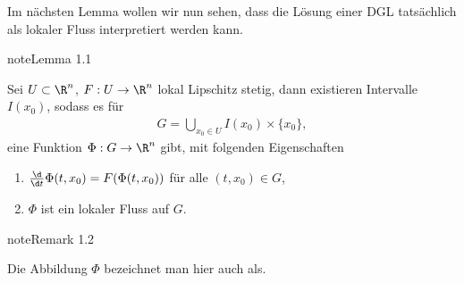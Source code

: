 \documentclass[letterpaper,10pt,english]{jupyterBook}
\begin{document}
Im nächsten Lemma wollen wir nun sehen, dass die Lösung einer DGL tatsächlich als lokaler Fluss interpretiert werden kann.
\label{ode/fluesse:lemma-3}
\begin{sphinxadmonition}{note}{Lemma 1.1}



Sei \(U\subset\R^n\), \(F:U \rightarrow \R^n\) lokal Lipschitz stetig, dann existieren Intervalle \(I(x_0)\), sodass es für
\begin{equation*}
\begin{split}G = \bigcup_{x_0\in U} I(x_0)\times\{x_0\},\end{split}
\end{equation*}
eine Funktion \(\Phi:G\rightarrow \R^n\) gibt, mit folgenden Eigenschaften
\begin{enumerate}
%
\item {} 
\(\frac{\d}{\d t} \Phi(t, x_0) = F(\Phi(t, x_0))\) für alle \((t,x_0)\in G\),

\item {} 
\(\Phi\) ist ein lokaler Fluss auf \(G\).

\end{enumerate}
\end{sphinxadmonition}
\label{ode/fluesse:remark-4}
\begin{sphinxadmonition}{note}{Remark 1.2}



Die Abbildung \(\Phi\) bezeichnet man hier auch als.
\end{sphinxadmonition}
\end{document}
